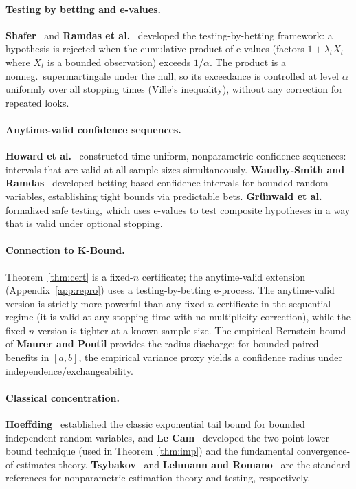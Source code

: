 \paragraph{Testing by betting and e-values.}
\textbf{Shafer}~\cite{shafer2019game} and \textbf{Ramdas et al.}\
\cite{ramdas2023gametheoretic} developed the testing-by-betting framework:
a hypothesis is rejected when the cumulative product of e-values (factors
$1 + \lambda_t X_t$ where $X_t$ is a bounded observation) exceeds $1/\alpha$.
The product is a nonneg.\ supermartingale under the null, so its exceedance
is controlled at level $\alpha$ uniformly over all stopping times (Ville's
inequality), without any correction for repeated looks.

\paragraph{Anytime-valid confidence sequences.}
\textbf{Howard et al.}~\cite{howard2021timeuniform} constructed
time-uniform, nonparametric confidence sequences: intervals that are valid
at all sample sizes simultaneously.
\textbf{Waudby-Smith and Ramdas}~\cite{waudbysmith2024betting} developed
betting-based confidence intervals for bounded random variables, establishing
tight bounds via predictable bets.
\textbf{Gr\"unwald et al.}~\cite{grunwald2024safe} formalized safe testing,
which uses e-values to test composite hypotheses in a way that is valid
under optional stopping.

\paragraph{Connection to K-Bound.}
Theorem~\ref{thm:cert} is a fixed-$n$ certificate; the anytime-valid
extension (Appendix~\ref{app:repro}) uses a testing-by-betting e-process.
The anytime-valid version is strictly more powerful than any fixed-$n$
certificate in the sequential regime (it is valid at any stopping time with
no multiplicity correction), while the fixed-$n$ version is tighter at a
known sample size.
The empirical-Bernstein bound of \textbf{Maurer and Pontil}
\cite{maurer2009empirical} provides the radius discharge: for bounded
paired benefits in $[a,b]$, the empirical variance proxy yields a confidence
radius under independence/exchangeability.

\paragraph{Classical concentration.}
\textbf{Hoeffding}~\cite{hoeffding1963probability} established the classic
exponential tail bound for bounded independent random variables, and
\textbf{Le Cam}~\cite{lecam1973convergence} developed the two-point lower
bound technique (used in Theorem~\ref{thm:imp}) and the fundamental
convergence-of-estimates theory.
\textbf{Tsybakov}~\cite{tsybakov2009introduction} and
\textbf{Lehmann and Romano}~\cite{lehmann2005testing} are the standard
references for nonparametric estimation theory and testing, respectively.

